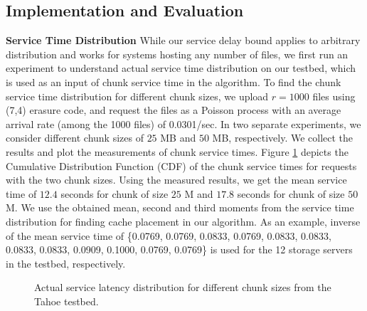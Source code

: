 \subsection{Implementation and Evaluation}
{\bf Service Time Distribution} While our service delay bound applies to arbitrary distribution and works for systems hosting any number of files, we first run an experiment to understand actual service time distribution on our testbed, which is used as an input of chunk service time in the algorithm. To find the chunk service time distribution for different chunk sizes,  we upload $r=1000$ files using (7,4) erasure code, and request the files as a Poisson process with an average arrival rate (among the 1000 files) of 0.0301/sec. In two separate experiments, we consider different chunk sizes of $25$ MB and $50$ MB, respectively.   We collect the results and plot the measurements of chunk service times.  Figure \ref{fig:cdf} depicts the Cumulative Distribution Function (CDF) of the chunk service times for requests with the two chunk sizes. Using the measured results, we get the mean service time of $12.4$ seconds for chunk of size $25$ M and $17.8$ seconds for chunk of size $50$ M.
We use the obtained mean, second and third moments from the service time distribution for finding cache placement in our algorithm. As an example, inverse  of the mean service time of \{0.0769, 0.0769, 0.0833, 0.0769, 0.0833, 0.0833, 0.0833, 0.0833, 0.0909, 0.1000, 0.0769, 0.0769\} is used for the 12 storage servers in the testbed, respectively. %
\begin{figure}[!thbp]
\vspace{-2mm}
\begin{center}
\vspace{-3mm}
\caption{Actual service latency distribution for different chunk sizes from the Tahoe testbed.}
\label{fig:cdf}
\end{center}
\vspace{-.1in}
\end{figure}

